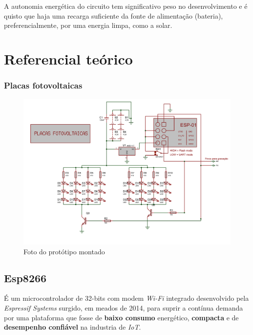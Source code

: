 \documentclass[
12pt,				%
openany,			%
twoside,			%
a4paper,			%
english,			%
french,				%
spanish,			%
brazil,				%
]{abntex2}
\begin{document}
A autonomia energética do circuito tem significativo peso no desenvolvimento e é quisto que haja uma recarga suficiente da fonte de alimentação (bateria), preferencialmente, por uma energia limpa, como a solar.
\part{Referencial teórico}


%

\section{Placas fotovoltaicas}

\begin{figure}[ht!]
    \includegraphics[width=450pt]{images/circuit.png}
    \caption{Foto do protótipo montado}
\end{figure}

\chapter{Esp8266}
É um microcontrolador de 32-bits com modem \textit{Wi-Fi} integrado desenvolvido pela \textit{Espressif Systems}
surgido, em meados de 2014, para suprir a contínua demanda por uma plataforma que fosse de \textsf{\textbf{baixo consumo}} 
energético, \textsf{\textbf{compacta}} e de \textsf{\textbf{desempenho confiável}} na industria de \textit{IoT}.
\end{document}
